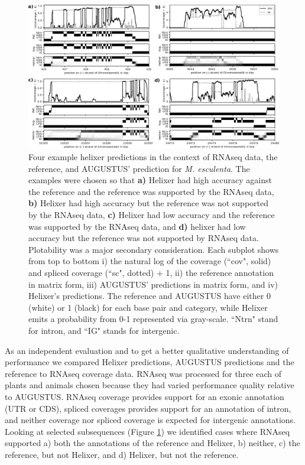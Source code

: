 \documentclass{bioinfo}
\begin{document}
\begin{figure}[!h]
\label{fig:cov_example_main}
\centerline{\includegraphics[width=\textwidth]{images/cov_examples/cov_example_main}}
\caption{Four example helixer predictions in the context of RNAseq data, the reference,
and AUGUSTUS' prediction for {\it M. esculenta}. The examples were chosen so
that {\bf a)} Helixer had high accuracy against the reference and the reference
was supported by the RNAseq data, {\bf b)} Helixer had high accuracy but the 
reference was not supported by the RNAseq data, {\bf c)} Helixer had low accuracy
and the reference was supported by the RNAseq data, and {\bf d)} helixer had low
accuracy but the reference was not supported by RNAseq data. Plotability was
a major secondary consideration. Each subplot shows from top to
bottom i) the natural log of the coverage (``cov", solid) and spliced coverage 
(``sc", dotted) + 1, ii) the reference annotation in matrix form, iii) 
AUGUSTUS' predictions in matrix form, and iv) Helixer's predictions. The reference
and AUGUSTUS have either 0 (white) or 1 (black) for each base pair and category, while
Helixer emits a probability from 0-1 represented via gray-scale. ``Ntrn" stand
for intron, and ``IG" stands for intergenic.
}
\end{figure}

As an independent evaluation and to get a better qualitative understanding of
performance we compared Helixer predictions, AUGUSTUS predictions and the
reference to RNAseq coverage data. RNAseq was processed for three each of plants
and animals chosen because they had varied performance quality relative to AUGUSTUS. 
RNAseq coverage provides support for an 
exonic annotation (UTR or CDS), spliced coverages provides support for an 
annotation of intron, and neither coverage nor spliced coverage is expected 
for intergenic annotations. Looking at selected subsequences (Figure \ref{fig:cov_example_main}) %
we identified cases where RNAseq supported a) both the annotations of the reference 
and Helixer, b) neither, c) the reference, but not Helixer,
and d) Helixer, but not the reference. 
\end{document}
